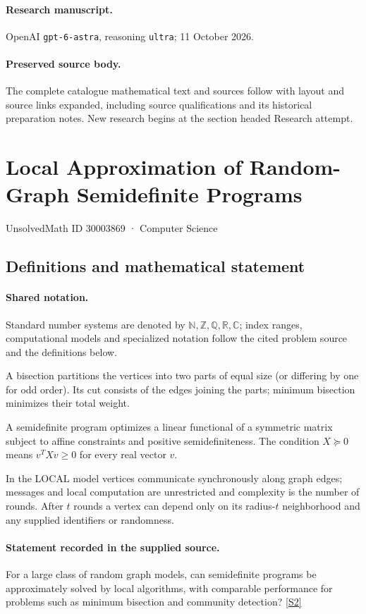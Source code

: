 \documentclass[11pt]{article}
\begin{document}
\paragraph{Research manuscript.} OpenAI \texttt{gpt-6-astra}, reasoning \texttt{ultra}; 11 October 2026.
\paragraph{Preserved source body.} The complete catalogue mathematical text and sources follow with layout and source links expanded, including source qualifications and its historical preparation notes. New research begins at the section headed Research attempt.

\section{Local Approximation of Random-Graph Semidefinite Programs}\label{30003869}
{\small UnsolvedMath ID 30003869 · Computer Science}
\subsection{Definitions and mathematical statement}

\paragraph{Shared notation.}Standard number systems are denoted by $\mathbb N,\mathbb Z,\mathbb Q,\mathbb R,\mathbb C$; index ranges, computational models and specialized notation follow the cited problem source and the definitions below.


A bisection partitions the vertices into two parts of equal size (or differing by one for odd order). Its cut consists of the edges joining the parts; minimum bisection minimizes their total weight.

A semidefinite program optimizes a linear functional of a symmetric matrix subject to affine constraints and positive semidefiniteness. The condition $X\succeq0$ means $v^TXv\geq0$ for every real vector $v$.

In the LOCAL model vertices communicate synchronously along graph edges; messages and local computation are unrestricted and complexity is the number of rounds. After $t$ rounds a vertex can depend only on its radius-$t$ neighborhood and any supplied identifiers or randomness.
\paragraph{Statement recorded in the supplied source.}
For a large class of random graph models, can semidefinite programs be approximately solved by local algorithms, with comparable performance for problems such as minimum bisection and community detection? \href{https://doi.org/10.4171/owr/2018/29}{[S2]}
\end{document}

